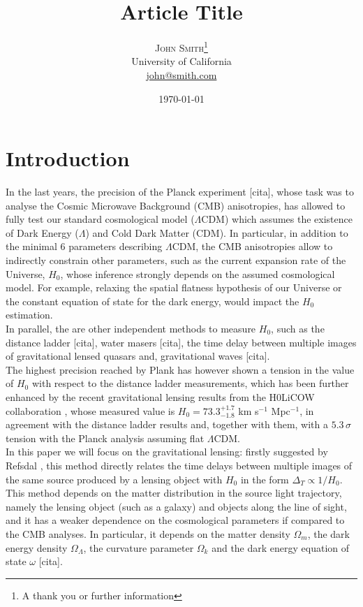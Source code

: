 \documentclass[twoside,twocolumn]{article}
\title{Article Title} %
\author{%
\textsc{John Smith}\thanks{A thank you or further information} \\[1ex] %
\normalsize University of California \\ %
\normalsize \href{mailto:john@smith.com}{john@smith.com} %
}
\date{\today} %
\begin{document}
\maketitle


\section{Introduction}
In the last years, the precision of the Planck experiment [cita], whose task was to analyse the Cosmic Microwave Background (CMB) anisotropies, has allowed to fully test our standard cosmological model ($\Lambda$CDM) which assumes the existence of Dark Energy ($\Lambda$) and Cold Dark Matter (CDM). In particular, in addition to the minimal 6 parameters describing $\Lambda$CDM, the CMB anisotropies allow to indirectly constrain other parameters, such as the current expansion rate of the Universe, $H_0$, whose inference strongly depends on the assumed cosmological model. For example, relaxing the spatial flatness hypothesis of our Universe or the constant equation of state for the dark energy, would impact the $H_0$ estimation.
\\
In parallel, the are other independent methods to measure $H_0$, such as the distance ladder [cita], water masers [cita], the time delay between multiple images of gravitational lensed quasars \cite{h0licow_I} and, gravitational waves [cita]. 
\\
The highest precision reached by Plank has however shown a tension in the value of $H_0$ with respect to the distance ladder measurements, which has been further enhanced by the recent gravitational lensing results from the H0LiCOW collaboration \cite{h0licow_XIII}, whose measured value is $H_0=73.3^{+1.7}_{-1.8}$ km s$^{-1}$ Mpc$^{-1}$, in agreement with the distance ladder results and, together with them, with a $5.3 \, \sigma$ tension with the Planck analysis assuming flat $\Lambda$CDM.
\\
In this paper we will focus on the gravitational lensing: firstly suggested by Refsdal \cite{refsdal}, this method directly relates the time delays between multiple images of the same source produced by a lensing object with $H_0$ in the form $\Delta_T \propto 1/H_0$. This method depends on the matter distribution in the source light trajectory, namely the lensing object (such as a galaxy) and objects along the line of sight, and it has a weaker dependence on the cosmological parameters if compared to the CMB analyses. In particular, it depends on the matter density $\Omega_m$, the dark energy density $\Omega_\Lambda$, the curvature parameter $\Omega_k$ and the dark energy equation of state $\omega$ [cita].
\end{document}
